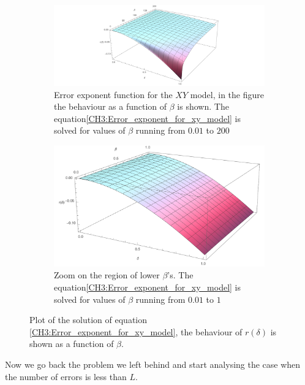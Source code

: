 \begin{figure}[H]
\centering
\begin{subfigure}[b]{0.63\textwidth}
    \centering
    \includegraphics[width = \textwidth]{Figures/Error_Exponents.pdf}
    \caption{Error exponent function for the $XY$ model, in the figure the behaviour as a function of $\beta$ is shown. The equation\eqref{CH3:Error_exponent_for_xy_model} is solved for values of $\beta$ running from $0.01$ to $200$}
    \label{error_exponent}
\end{subfigure}
\hfill
\begin{subfigure}[b]{0.35\textwidth}
    \centering
    \includegraphics[width = \textwidth]{Figures/Error_Exponents_zoom.pdf}
    \caption{Zoom on the region of lower $\beta$'s. The equation\eqref{CH3:Error_exponent_for_xy_model} is solved for values of $\beta$ running from $0.01$ to $1$}
    \label{error_exponent_zoom}
\end{subfigure}
\caption{Plot of the solution of equation \eqref{CH3:Error_exponent_for_xy_model}, the behaviour of $r(\delta)$ is shown as a function of $\beta$.}
       \label{CH3:Results_Exponent_error_XY_model}
\end{figure}

Now we go back the problem we left behind and start analysing the case when the number of errors is less than $L$.
